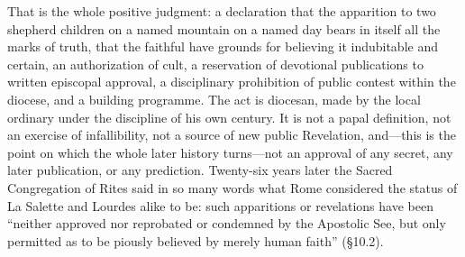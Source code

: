 That is the whole positive judgment: a declaration that the
apparition to two shepherd children on a named mountain on a named
day bears in itself all the marks of truth, that the faithful have
grounds for believing it indubitable and certain, an authorization
of cult, a reservation of devotional publications to written
episcopal approval, a disciplinary prohibition of public contest
within the diocese, and a building programme. The act is diocesan,
made by the local ordinary under the discipline of his own century.
It is not a papal definition, not an exercise of infallibility, not
a source of new public Revelation, and---this is the point on which
the whole later history turns---not an approval of any secret, any
later publication, or any prediction. Twenty-six years later the
Sacred Congregation of Rites said in so many words what Rome
considered the status of La Salette and Lourdes alike to be: such
apparitions or revelations have been ``neither approved nor
reprobated or condemned by the Apostolic See, but only permitted as
to be piously believed by merely human faith'' (\S10.2).

